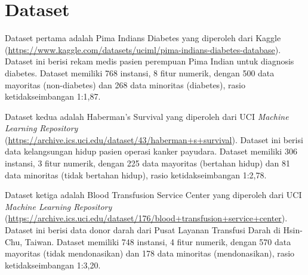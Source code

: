 \section{Dataset}

Dataset pertama adalah Pima Indians Diabetes yang diperoleh dari Kaggle (\url{https://www.kaggle.com/datasets/uciml/pima-indians-diabetes-database}). Dataset ini berisi rekam medis pasien perempuan Pima Indian untuk diagnosis diabetes. Dataset memiliki 768 instansi, 8 fitur numerik, dengan 500 data mayoritas (non-diabetes) dan 268 data minoritas (diabetes), rasio ketidakseimbangan 1:1,87.

Dataset kedua adalah Haberman's Survival yang diperoleh dari UCI \textit{Machine Learning Repository} (\url{https://archive.ics.uci.edu/dataset/43/haberman+s+survival}). Dataset ini berisi data kelangsungan hidup pasien operasi kanker payudara. Dataset memiliki 306 instansi, 3 fitur numerik, dengan 225 data mayoritas (bertahan hidup) dan 81 data minoritas (tidak bertahan hidup), rasio ketidakseimbangan 1:2,78.

Dataset ketiga adalah Blood Transfusion Service Center yang diperoleh dari UCI \textit{Machine Learning Repository} (\url{https://archive.ics.uci.edu/dataset/176/blood+transfusion+service+center}). Dataset ini berisi data donor darah dari Pusat Layanan Transfusi Darah di Hsin-Chu, Taiwan. Dataset memiliki 748 instansi, 4 fitur numerik, dengan 570 data mayoritas (tidak mendonasikan) dan 178 data minoritas (mendonasikan), rasio ketidakseimbangan 1:3,20.

